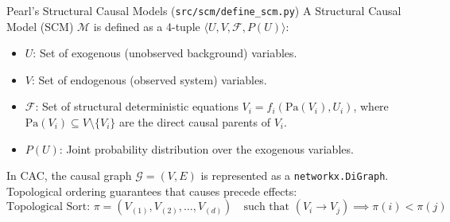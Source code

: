\documentclass[11pt,a4paper]{article}
\begin{document}
\begin{parentconcept}{Pearl's Structural Causal Models (\texttt{src/scm/define\_scm.py})}
A Structural Causal Model (SCM) $\mathcal{M}$ is defined as a 4-tuple $\langle U, V, \mathcal{F}, P(U) \rangle$:
\begin{itemize}[leftmargin=1.5em]
    \item $U$: Set of exogenous (unobserved background) variables.
    \item $V$: Set of endogenous (observed system) variables.
    \item $\mathcal{F}$: Set of structural deterministic equations $V_i = f_i(\mathrm{Pa}(V_i), U_i)$, where $\mathrm{Pa}(V_i) \subseteq V \setminus \{V_i\}$ are the direct causal parents of $V_i$.
    \item $P(U)$: Joint probability distribution over the exogenous variables.
\end{itemize}
In CAC, the causal graph $\mathcal{G} = (V, E)$ is represented as a \texttt{networkx.DiGraph}. Topological ordering guarantees that causes precede effects:
\begin{equation}
\text{Topological Sort: } \pi = (V_{(1)}, V_{(2)}, \dots, V_{(d)}) \quad \text{such that } (V_i \to V_j) \implies \pi(i) < \pi(j)
\end{equation}
\end{parentconcept}
\end{document}
